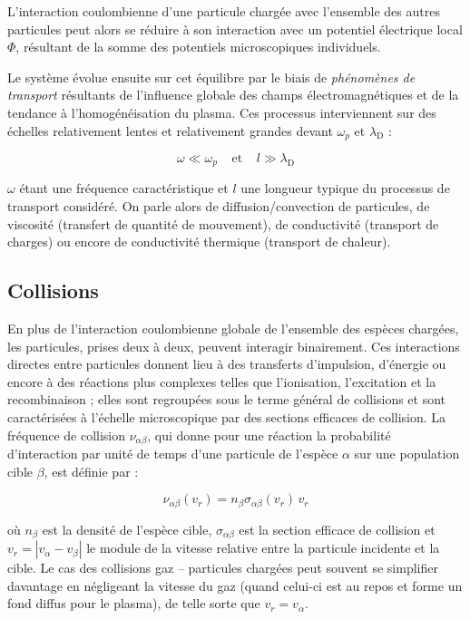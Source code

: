 \begin{refsection}
L'interaction coulombienne d'une particule chargée avec l'ensemble des autres particules peut alors
se réduire à son interaction avec un potentiel électrique local $\Phi$,
résultant de la somme des potentiels microscopiques individuels.

Le système évolue ensuite sur cet équilibre par le biais de
\emph{phénomènes de transport} résultants de l'influence
globale des champs électromagnétiques et de la tendance à
l'homogénéisation du plasma.
Ces processus interviennent sur des échelles relativement
lentes et relativement grandes devant $\omega_{p}$ et $\lambda_\text{D}$ :

\begin{equation}
\omega\ll \omega_{p}
\;\;\;\;\text{et}\;\;\;\;l\gg\lambda_\text{D}
\end{equation}

$\omega$ étant une fréquence caractéristique et $l$ une longueur typique
du processus de transport considéré.
On parle alors de diffusion/convection de particules, de viscosité (transfert de
quantité de mouvement), de conductivité (transport de charges) ou encore de
conductivité thermique (transport de chaleur).

\subsection{Collisions}
\label{1-Collisions}
En plus de l'interaction coulombienne globale de l'ensemble des espèces chargées, 
les particules, prises deux à deux, peuvent interagir binairement. 
Ces interactions directes entre particules donnent lieu à des transferts
d'impulsion, d'énergie ou encore à des réactions plus complexes telles que
l'ionisation, l'excitation et la recombinaison ; elles sont regroupées
sous le terme général de collisions et sont caractérisées à l'échelle
microscopique par des sections efficaces de collision. La fréquence de
collision $\nu_{\alpha \beta}$, qui donne pour une réaction la probabilité
d'interaction par unité de temps d'une particule de l'espèce $\alpha$ sur une
population cible $\beta$, est définie par :

\begin{equation}
\label{1-collisionfreq}
	\nu_{\alpha
	\beta}(v_r)=n_\beta\sigma_{\alpha
	\beta}(v_r)\,v_r
\end{equation}

où $n_\beta$ est la densité de l'espèce cible, $\sigma_{\alpha \beta}$ est la
section efficace de collision et $v_r=|v_\alpha-v_\beta|$ le module de
la vitesse relative entre la particule incidente et la cible. 
Le cas des collisions gaz -- particules chargées peut souvent se simplifier
davantage en négligeant la vitesse du gaz (quand celui-ci est au repos et forme
un fond diffus pour le plasma), de telle sorte que $v_r=v_\alpha$.


\end{refsection}
